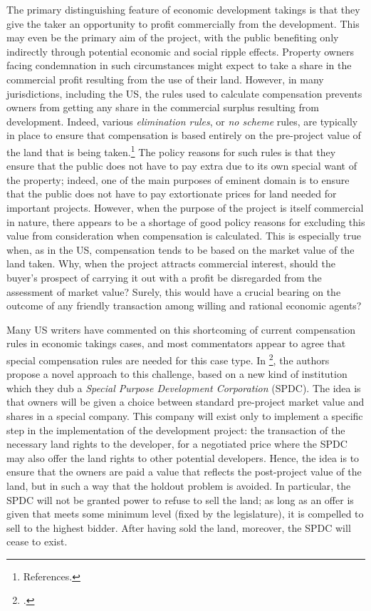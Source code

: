 The primary distinguishing feature of economic development takings is that they give the taker an opportunity to profit commercially from the development. This may even be the primary aim of the project, with the public benefiting only indirectly through potential economic and social ripple effects. Property owners facing condemnation in such circumstances might expect to take a share in the commercial profit resulting from the use of their land. However, in many jurisdictions, including the US, the rules used to calculate compensation prevents owners from getting any share in the commercial surplus resulting from development. Indeed, various {\it elimination rules}, or {\it no scheme} rules, are typically in place to ensure that compensation is based entirely on the pre-project value of the land that is being taken.\footnote{References.} The policy reasons for such rules is that they ensure that the public does not have to pay extra due to its own special want of the property; indeed, one of the main purposes of eminent domain is to ensure that the public does not have to pay extortionate prices for land needed for important projects. However, when the purpose of the project is itself commercial in nature, there appears to be a shortage of good policy reasons for excluding this value from consideration when compensation is calculated. This is especially true when, as in the US, compensation tends to be based on the market value of the land taken. Why, when the project attracts commercial interest, should the buyer's prospect of carrying it out with a profit be disregarded from the assessment of market value? Surely, this would have a crucial bearing on the outcome of any friendly transaction among willing and rational economic agents? 

Many US writers have commented on this shortcoming of current compensation rules in economic takings cases, and most commentators appear to agree that special compensation rules are needed for this case type. In \footcite{eminc07}, the authors propose a novel approach to this challenge, based on a new kind of institution which they dub a {\it Special Purpose Development Corporation} (SPDC). The idea is that owners will be given a choice between standard pre-project market value and shares in a special company. This company will exist only to implement a specific step in the implementation of the development project: the transaction of the necessary land rights to the developer, for a negotiated price where the SPDC may also offer the land rights to other potential developers. Hence, the idea is to ensure that the owners are paid a value that reflects the post-project value of the land, but in such a way that the holdout problem is avoided. In particular, the SPDC will not be granted power to refuse to sell the land; as long as an offer is given that meets some minimum level (fixed by the legislature), it is compelled to sell to the highest bidder.  After having sold the land, moreover, the SPDC will cease to exist. 

